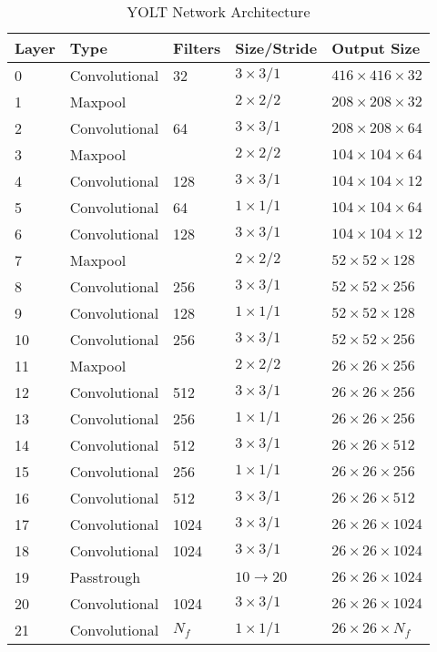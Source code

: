 \begin{table}[]
\centering
\begin{tabular}{lllll}
\hline
Layer & Type          & Filters & Size/Stride & Output Size \\ \hline
0     & Convolutional & 32      & $3 \times 3 / 1$     & $416 \times 416 \times 32$  \\
1     & Maxpool       &         & $2 \times 2 / 2$     & $208 \times 208 \times 32$  \\
2     & Convolutional & 64      & $3 \times 3 / 1$     & $208 \times 208 \times 64$  \\
3     & Maxpool       &         & $2 \times 2 / 2$     & $104 \times 104 \times 64$  \\
4     & Convolutional & 128     & $3 \times 3 / 1$     & $104 \times 104 \times 12$  \\
5     & Convolutional & 64      & $1 \times 1 / 1$     & $104 \times 104 \times 64$  \\
6     & Convolutional & 128     & $3 \times 3 / 1$     & $104 \times 104 \times 12$  \\
7     & Maxpool       &         & $2 \times 2 / 2$     & $52 \times 52 \times 128 $  \\
8     & Convolutional & 256     & $3 \times 3 / 1$     & $52 \times 52 \times 256 $  \\
9     & Convolutional & 128     & $1 \times 1 / 1$     & $52 \times 52 \times 128 $  \\
10    & Convolutional & 256     & $3 \times 3 / 1$     & $52 \times 52 \times 256 $  \\
11    & Maxpool       &         & $2 \times 2 / 2$     & $26 \times 26 \times 256 $  \\
12    & Convolutional & 512     & $3 \times 3 / 1$     & $26 \times 26 \times 256 $  \\
13    & Convolutional & 256     & $1 \times 1 / 1$     & $26 \times 26 \times 256 $  \\
14    & Convolutional & 512     & $3 \times 3 / 1$     & $26 \times 26 \times 512 $  \\
15    & Convolutional & 256     & $1 \times 1 / 1$     & $26 \times 26 \times 256 $  \\
16    & Convolutional & 512     & $3 \times 3 / 1$     & $26 \times 26 \times 512 $  \\
17    & Convolutional & 1024    & $3 \times 3 / 1$     & $26 \times 26 \times 1024$  \\
18    & Convolutional & 1024    & $3 \times 3 / 1$     & $26 \times 26 \times 1024$  \\
19    & Passtrough    &         & $10 \rightarrow 20  $     & $26 \times 26 \times 1024$  \\
20    & Convolutional & 1024    & $3 \times 3 / 1$     & $26 \times 26 \times 1024$  \\
21    & Convolutional & $N_f$     & $1 \times 1 / 1$     & $26 \times 26 \times N_f $ 
\end{tabular}
\caption{YOLT Network Architecture}
\label{tab:YOLTArchi}
\end{table}


